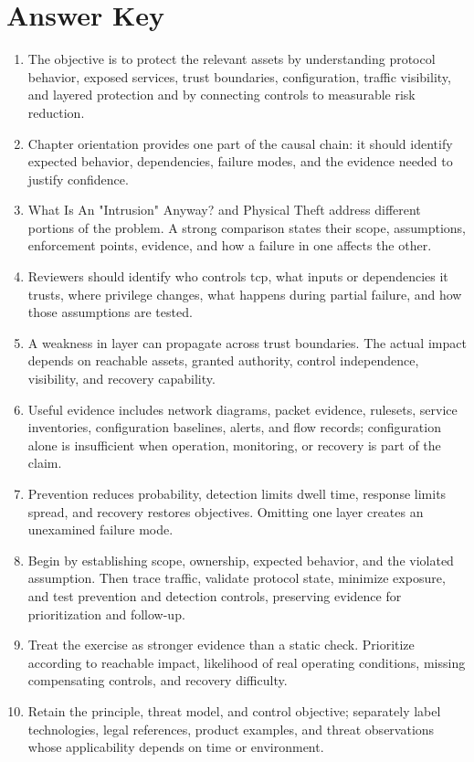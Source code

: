 \documentclass[11pt,letterpaper]{article}
\begin{document}
\section*{Answer Key}
\begin{enumerate}
\item The objective is to protect the relevant assets by understanding protocol behavior, exposed services, trust boundaries, configuration, traffic visibility, and layered protection and by connecting controls to measurable risk reduction.
\item Chapter orientation provides one part of the causal chain: it should identify expected behavior, dependencies, failure modes, and the evidence needed to justify confidence.
\item What Is An "Intrusion" Anyway? and Physical Theft address different portions of the problem. A strong comparison states their scope, assumptions, enforcement points, evidence, and how a failure in one affects the other.
\item Reviewers should identify who controls tcp, what inputs or dependencies it trusts, where privilege changes, what happens during partial failure, and how those assumptions are tested.
\item A weakness in layer can propagate across trust boundaries. The actual impact depends on reachable assets, granted authority, control independence, visibility, and recovery capability.
\item Useful evidence includes network diagrams, packet evidence, rulesets, service inventories, configuration baselines, alerts, and flow records; configuration alone is insufficient when operation, monitoring, or recovery is part of the claim.
\item Prevention reduces probability, detection limits dwell time, response limits spread, and recovery restores objectives. Omitting one layer creates an unexamined failure mode.
\item Begin by establishing scope, ownership, expected behavior, and the violated assumption. Then trace traffic, validate protocol state, minimize exposure, and test prevention and detection controls, preserving evidence for prioritization and follow-up.
\item Treat the exercise as stronger evidence than a static check. Prioritize according to reachable impact, likelihood of real operating conditions, missing compensating controls, and recovery difficulty.
\item Retain the principle, threat model, and control objective; separately label technologies, legal references, product examples, and threat observations whose applicability depends on time or environment.
\end{enumerate}
\end{document}
